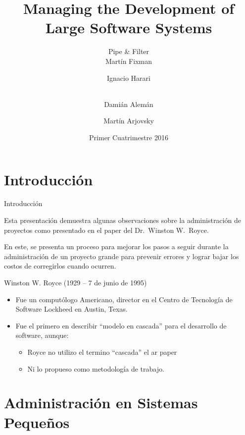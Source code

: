 \documentclass{beamer}
\title{Managing the Development of Large Software Systems}
\author[Pipe \& Filter]{%
	{\Large Pipe \& Filter} \\ \vspace{1em}
	Martín Fixman\inst{1} \and
	Ignacio Harari\inst{1} \and \\
	Damián Alemán\inst{1} \and
	Martín Arjovsky\inst{1}
}
\institute{\inst{1} Facultad de Ciencias Exactas y Naturales}
\date{Primer Cuatrimestre 2016}
\begin{document}
\begin{frame}[fragile]
\titlepage{}
\end{frame}

\section{Introducción}

\begin{frame}[fragile]{Introducción}

Esta presentación demuestra algunas observaciones sobre la administración de proyectos como presentado en el paper del {\large Dr.\ Winston W.\ Royce}\cite{royce70}.

\bigskip

En este, se presenta un proceso para mejorar los pasos a seguir durante la administración de un proyecto grande para prevenir errores y lograr bajar los costos de corregirlos cuando ocurren.

\end{frame}

\begin{frame}
Winston W. Royce (1929 – 7 de junio de 1995)

\begin{itemize}

\item Fue un computólogo Americano, director en el Centro de Tecnología de Software Lockheed en Austin, Texas.

\item Fue el primero en describir ``modelo en cascada'' para el desarrollo de software, aunque: 
\begin{itemize}
\item Royce no utilizo el termino ``cascada'' el ar paper
\item Ni lo propueso como metodología de trabajo.
\end{itemize}
\end{itemize}

\end{frame}


\section{Administración en Sistemas Pequeños}
\end{document}
